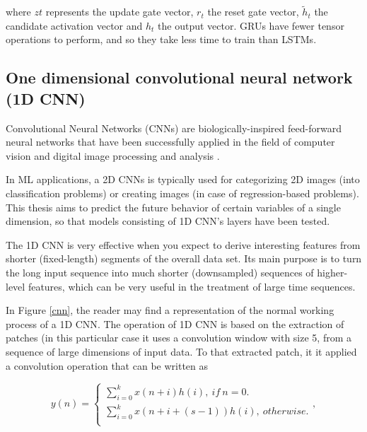 where $zt$ represents the update gate vector, $r_t$ the reset gate vector, $\tilde{h}_t$ the candidate activation vector and $h_t$ the output vector. \ac{GRU}s have fewer tensor operations to perform, and so they take less time to train than \ac{LSTM}s.  



\subsection{One dimensional convolutional neural network (1D CNN)}


Convolutional Neural Networks (\ac{CNN}s) are biologically-inspired feed-forward neural networks that have been successfully applied in the field of computer vision and digital image processing and analysis \cite{cnn0}.

In \ac{ML} applications, a \ac{2D CNN}s is typically used for categorizing 2D images (into classification problems) or creating images (in case of regression-based problems). This thesis aims to predict the future behavior of certain variables of a single dimension, so that models consisting of \ac{1D CNN}'s layers have been tested.

The \ac{1D CNN} is very effective when you expect to derive interesting features from shorter (fixed-length) segments of the overall data set. Its main purpose is to turn the long input sequence into much shorter (downsampled) sequences of higher-level features, which can be very useful in the treatment of large time sequences.

In Figure \ref{cnn}, the reader may find a representation of the normal working process of a \ac{1D CNN}. The operation of \ac{1D CNN} is based on the extraction of patches (in this particular case it uses a convolution window with size 5, from a sequence of large dimensions of input data. To that extracted patch, it it applied a convolution operation that can be written as \cite{cnn2} 

\begin{equation}
y(n)=
    \begin{cases} 
            
        \sum_{i=0}^k x(n+i)h(i),\  if \  n=0.\\
        \sum_{i=0}^k x(n+i+(s-1))h(i),\  otherwise.\\
    
    \end{cases} ,
\end{equation}

